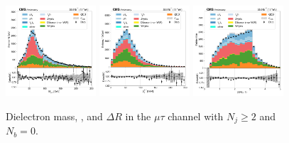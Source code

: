 \begin{figure}[htb!]
    \centering
    \includegraphics[width=0.3\textwidth]{chapters/Analysis/sectionPlots/figures/data_mc_overlays/mutau_2016_cat_gt2_eq0_signal_linear_lepton_dilepton1_mass}
    \includegraphics[width=0.3\textwidth]{chapters/Analysis/sectionPlots/figures/data_mc_overlays/mutau_2016_cat_gt2_eq0_signal_linear_lepton_dilepton1_pt}
    \includegraphics[width=0.3\textwidth]{chapters/Analysis/sectionPlots/figures/data_mc_overlays/mutau_2016_cat_gt2_eq0_signal_linear_lepton_dilepton1_delta_r}
    \caption{Dielectron mass, \pt, and $\Delta R$ in the $\mu\tau$ channel
    with $N_{j} \geq 2$ and $N_{b} = 0$.}
    \label{fig:analysis:plots:mutau_4_dilepton}
\end{figure}

